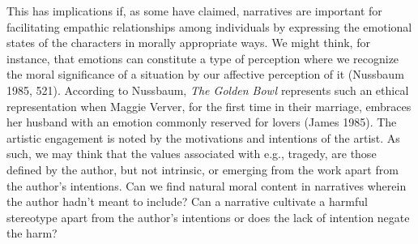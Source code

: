 \documentclass[
  letterpaper,
  DIV=11,
  numbers=noendperiod]{scrartcl}
\theoremstyle{remark}
\begin{document}
This has implications if, as some have claimed, narratives are important
for facilitating empathic relationships among individuals by expressing
the emotional states of the characters in morally appropriate ways. We
might think, for instance, that emotions can constitute a type of
perception where we recognize the moral significance of a situation by
our affective perception of it (Nussbaum 1985, 521). According to
Nussbaum, \emph{The Golden Bowl} represents such an ethical
representation when Maggie Verver, for the first time in their marriage,
embraces her husband with an emotion commonly reserved for lovers (James
1985). The artistic engagement is noted by the motivations and
intentions of the artist. As such, we may think that the values
associated with e.g., tragedy, are those defined by the author, but not
intrinsic, or emerging from the work apart from the author's intentions.
Can we find natural moral content in narratives wherein the author
hadn't meant to include? Can a narrative cultivate a harmful stereotype
apart from the author's intentions or does the lack of intention negate
the harm?
\end{document}

